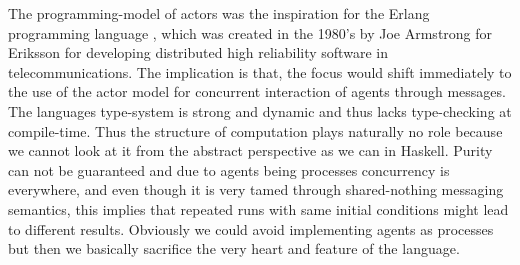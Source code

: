 The programming-model of actors \cite{agha_actors:_1986} was the inspiration for the Erlang programming language \cite{armstrong_erlang_2010}, which was created in the 1980's by Joe Armstrong for Eriksson for developing distributed high reliability software in telecommunications. The implication is that, the focus would shift immediately to the use of the actor model for concurrent interaction of agents through messages. The languages type-system is strong and dynamic and thus lacks type-checking at compile-time. Thus the structure of computation plays naturally no role because we cannot look at it from the abstract perspective as we can in Haskell. Purity can not be guaranteed and due to agents being processes concurrency is everywhere, and even though it is very tamed through shared-nothing messaging semantics, this implies that repeated runs with same initial conditions might lead to different results. Obviously we could avoid implementing agents as processes but then we basically sacrifice the very heart and feature of the language.
